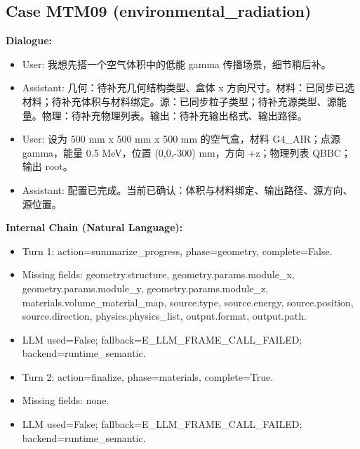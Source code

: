 \documentclass[11pt]{ctexart}
\begin{document}
\subsection{Case MTM09 (environmental\_radiation)}
\textbf{Dialogue:}
\begin{itemize}
\item User: 我想先搭一个空气体积中的低能 gamma 传播场景，细节稍后补。
\item Assistant: 几何：待补充几何结构类型、盒体 x 方向尺寸。材料：已同步已选材料；待补充体积与材料绑定。源：已同步粒子类型；待补充源类型、源能量。物理：待补充物理列表。输出：待补充输出格式、输出路径。
\item User: 设为 500 mm x 500 mm x 500 mm 的空气盒，材料 G4\_AIR；点源 gamma，能量 0.5 MeV，位置 (0,0,-300) mm，方向 +z；物理列表 QBBC；输出 root。
\item Assistant: 配置已完成。当前已确认：体积与材料绑定、输出路径、源方向、源位置。
\end{itemize}
\textbf{Internal Chain (Natural Language):}
\begin{itemize}
\item Turn 1: action=summarize\_progress, phase=geometry, complete=False.
\item Missing fields: geometry.structure, geometry.params.module\_x, geometry.params.module\_y, geometry.params.module\_z, materials.volume\_material\_map, source.type, source.energy, source.position, source.direction, physics.physics\_list, output.format, output.path.
\item LLM used=False; fallback=E\_LLM\_FRAME\_CALL\_FAILED; backend=runtime\_semantic.
\item Turn 2: action=finalize, phase=materials, complete=True.
\item Missing fields: none.
\item LLM used=False; fallback=E\_LLM\_FRAME\_CALL\_FAILED; backend=runtime\_semantic.
\end{itemize}
\end{document}
